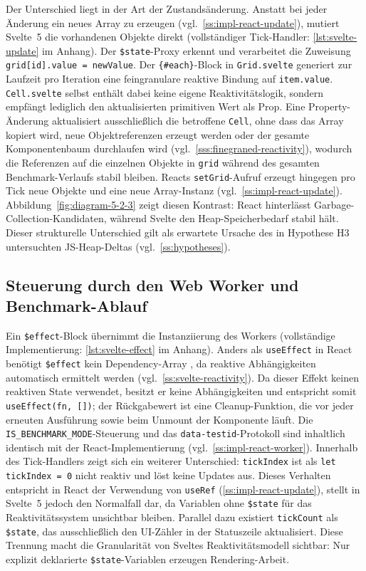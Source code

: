 Der Unterschied liegt in der Art der Zustandsänderung. Anstatt bei jeder Änderung ein neues Array zu erzeugen (vgl.~\cref{ss:impl-react-update}), mutiert Svelte~5 die vorhandenen Objekte direkt (vollständiger Tick-Handler: \cref{lst:svelte-update} im Anhang). Der \texttt{\$state}-Proxy erkennt und verarbeitet die Zuweisung \texttt{grid[id].value = newValue}. Der \texttt{\{\#each\}}-Block in \texttt{Grid.svelte} generiert zur Laufzeit pro Iteration eine feingranulare reaktive Bindung auf \texttt{item.value}. \texttt{Cell.svelte} selbst enthält dabei keine eigene Reaktivitätslogik, sondern empfängt lediglich den aktualisierten primitiven Wert als Prop. Eine Property-Änderung aktualisiert ausschließlich die betroffene \texttt{Cell}, ohne dass das Array kopiert wird, neue Objektreferenzen erzeugt werden oder der gesamte Komponentenbaum durchlaufen wird (vgl.~\cref{sss:finegraned-reactivity}), wodurch die Referenzen auf die einzelnen Objekte in \texttt{grid} während des gesamten Benchmark-Verlaufs stabil bleiben. Reacts \texttt{setGrid}-Aufruf erzeugt hingegen pro Tick neue Objekte und eine neue Array-Instanz (vgl.~\cref{ss:impl-react-update}). Abbildung~\ref{fig:diagram-5-2-3} zeigt diesen Kontrast: React hinterlässt Garbage-Collection-Kandidaten, während Svelte den Heap-Speicherbedarf stabil hält. Dieser strukturelle Unterschied gilt als erwartete Ursache des in Hypothese H3 untersuchten JS-Heap-Deltas (vgl.~\cref{ss:hypotheses}).

\subsection{Steuerung durch den Web Worker und Benchmark-Ablauf}
\label{ss:impl-svelte-worker}

Ein \texttt{\$effect}-Block übernimmt die Instanziierung des Workers (vollständige Implementierung: \cref{lst:svelte-effect} im Anhang). Anders als \texttt{useEffect} in React benötigt \texttt{\$effect} kein Dependency-Array \cite{react_introduction, svelte_migration}, da reaktive Abhängigkeiten automatisch ermittelt werden (vgl.~\cref{ss:svelte-reactivity}). Da dieser Effekt keinen reaktiven State verwendet, besitzt er keine Abhängigkeiten und entspricht somit \texttt{useEffect(fn, [])}; der Rückgabewert ist eine Cleanup-Funktion, die vor jeder erneuten Ausführung sowie beim Unmount der Komponente läuft. Die \texttt{IS\_BENCHMARK\_MODE}-Steuerung und das \texttt{data-testid}-Protokoll sind inhaltlich identisch mit der React-Implementierung (vgl.~\cref{ss:impl-react-worker}). Innerhalb des Tick-Handlers zeigt sich ein weiterer Unterschied: \texttt{tickIndex} ist als \texttt{let tickIndex = 0} nicht reaktiv und löst keine Updates aus. Dieses Verhalten entspricht in React der Verwendung von \texttt{useRef} (\cref{ss:impl-react-update}), stellt in Svelte~5 jedoch den Normalfall dar, da Variablen ohne \texttt{\$state} für das Reaktivitätssystem unsichtbar bleiben. Parallel dazu existiert \texttt{tickCount} als \texttt{\$state}, das ausschließlich den UI-Zähler in der Statuszeile aktualisiert. Diese Trennung macht die Granularität von Sveltes Reaktivitätsmodell sichtbar: Nur explizit deklarierte \texttt{\$state}-Variablen erzeugen Rendering-Arbeit.

